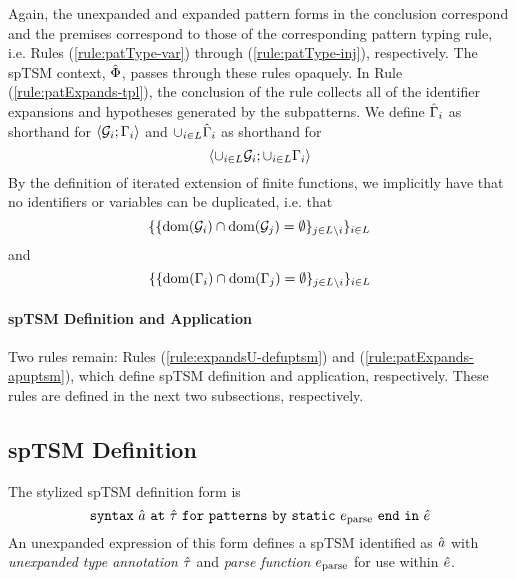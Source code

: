 {{{{Again, the unexpanded and expanded pattern forms in the conclusion correspond and the premises correspond to those of the corresponding pattern typing rule, i.e. Rules (\ref{rule:patType-var}) through (\ref{rule:patType-inj}), respectively. The spTSM context, $\hat\Phi$, passes through these rules opaquely. In Rule (\ref{rule:patExpands-tpl}), the conclusion of the rule collects all of the identifier expansions and hypotheses generated by the subpatterns. We define $\hat\Gamma_i$ as shorthand for $\langle \mathcal{G}_i; \Gamma_i \rangle$ and $\cup_{i \in L} \hat\Gamma_i$ as shorthand for \[\langle \cup_{i \in L} \mathcal{G}_i; \cup_{i \in L} \Gamma_i \rangle\] By the definition of iterated extension of finite functions, we implicitly have that no identifiers or variables can be duplicated, i.e. that 
\[\{\{\text{dom}(\mathcal{G}_i) \cap \text{dom}(\mathcal{G}_j) = \emptyset\}_{j \in L \setminus i}\}_{i \in L}\]
and
\[\{\{\text{dom}(\Gamma_i) \cap \text{dom}(\Gamma_j) = \emptyset\}_{j \in L \setminus i}\}_{i \in L}\]

\paragraph{spTSM Definition and Application}
Two rules remain: Rules (\ref{rule:expandsU-defuptsm}) and (\ref{rule:patExpands-apuptsm}), which define spTSM definition and application, respectively. These rules are  defined in the next two subsections, respectively.





\subsection{spTSM Definition}\label{sec:uptsm-definition}

The stylized spTSM definition form is \[\texttt{syntax}~\hat{a}~\texttt{at}~{\hat\tau}~\texttt{for}~\texttt{patterns}~\texttt{by}~\texttt{static}~e_\text{parse}~\texttt{end}~\texttt{in}~{\hat e}\] 
An unexpanded expression of this form defines a {spTSM} identified as $\hat{a}$ with \emph{unexpanded type annotation} ${\hat\tau}$ and \emph{parse function} $e_\text{parse}$ for use within ${\hat e}$. 

}}}}
